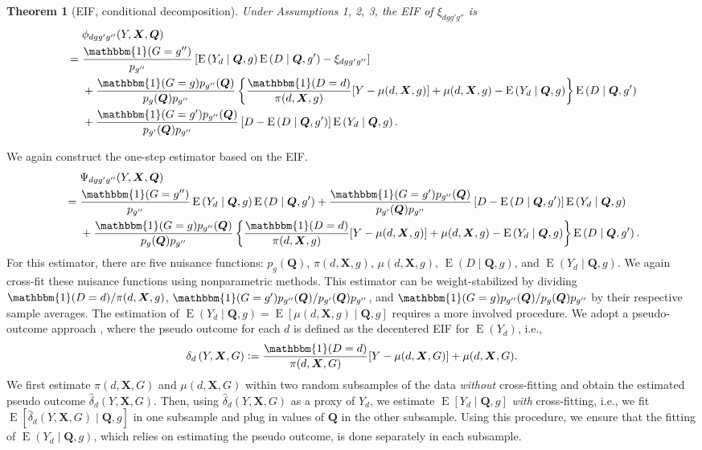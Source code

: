\documentclass[12pt,a4paper]{article}
\newtheorem{prop}{Theorem}
\newcommand{\E}{\operatorname{E}}
\def\X{{\boldsymbol X}}
\def\Q{{\boldsymbol Q}}
\def\one{\mathbbm{1}}
\newcommand{\defeq}{\vcentcolon=}
\begin{document}
\begin{prop}[EIF, conditional decomposition]
Under Assumptions 1, 2, 3, the EIF of $\xi_{dgg'g''}$ is 
\begin{align*}
     &\phantom{{}={}} \phi_{dgg'g''}(Y,\X,\Q) \\
    &=\frac{\one(G=g'')}{p_{g''}} \left[ \E \left(Y_d \mid \Q, g \right) \E \left(D \mid \Q, g' \right) - \xi_{dgg'g''} \right] \\
    &\phantom{{}={}} + \frac{\one(G=g) p_{g''}(\Q)}{p_g(\Q)p_{g''}} \left\{ \frac{\one(D=d)}{\pi(d,\X,g)} [Y-\mu(d,\X,g)]+\mu(d,\X,g) - \E \left(Y_d \mid \Q,g \right) \right\} \E \left(D \mid \Q,g' \right) \\
    &\phantom{{}={}} + \frac{\one(G=g')p_{g''}(\Q)}{p_{g'}(\Q)p_{g''}} \left[ D-\E \left(D \mid \Q, g' \right) \right] \E\left( Y_d \mid \Q, g \right).
\end{align*}
\end{prop}
We again construct the one-step estimator based on the EIF. 
\begin{align*}
    &\phantom{{}={}} \Psi_{dgg'g''}(Y,\X,\Q) \\
    &=\frac{\one(G=g'')}{p_{g''}} \E \left(Y_d \mid \Q, g \right) \E \left(D \mid \Q, g' \right) + \frac{\one(G=g')p_{g''}(\Q)}{p_{g'}(\Q)p_{g''}} \left[ D-\E \left(D \mid \Q, g' \right) \right] \E\left( Y_d \mid \Q, g \right) \\
    &\phantom{{}={}} + \frac{\one(G=g) p_{g''}(\Q)}{p_g(\Q)p_{g''}} \left\{ \frac{\one(D=d)}{\pi(d,\X,g)} [Y-\mu(d,\X,g)]+\mu(d,\X,g) - \E \left(Y_d \mid \Q,g \right) \right\} \E \left(D \mid \Q,g' \right).
\end{align*}
For this estimator, there are five nuisance functions: $p_g(\Q)$, $\pi(d,\X,g)$, $\mu(d,\X,g)$, $\E(D \mid \Q, g)$, and $\E(Y_d \mid \Q,g)$. We again cross-fit these nuisance functions using nonparametric methods. This estimator can be weight-stabilized by dividing $\one(D=d)/\pi(d,\X,g)$, $\one(G=g')p_{g''}(\Q)/p_{g'}(\Q)p_{g''}$, and $\one(G=g)p_{g''}(\Q)/p_g(\Q)p_{g''}$ by their respective sample averages. The estimation of $\E(Y_d \mid \Q,g)=\E[\mu(d,\X,g) \mid \Q,g]$ requires a more involved procedure. We adopt a pseudo-outcome approach \citep[e.g.,][]{van_der_laan_statistical_2006,semenova_debiased_2021}, where the pseudo outcome for each $d$ is defined as the decentered EIF for $\E(Y_d)$, i.e., 
$$ \delta_d \left(Y, \X,  G \right) \defeq \frac{\one(D=d)}{\pi(d, \X,G)} [Y-\mu(d,\X,G)] + \mu(d,\X,G).$$
We first estimate $\pi(d, \X,G)$ and $\mu(d,\X,G)$ within two random subsamples of the data \emph{without} cross-fitting and obtain the estimated pseudo outcome $\hat{\delta}_d \left(Y, \X,  G \right)$. Then, using $\hat{\delta}_d \left(Y, \X,  G \right)$ as a proxy of $Y_d$, we estimate $\E\left[Y_d \mid \Q, g \right]$ \emph{with} cross-fitting, i.e., we fit $\E\left[\hat{\delta}_d \left(Y, \X,  G \right) \mid \Q, g \right]$ in one subsample and plug in values of $\Q$ in the other subsample. Using this procedure, we ensure that the fitting of $\E(Y_d \mid \Q,g)$, which relies on estimating the pseudo outcome, is done separately in each subsample. 
\end{document}
